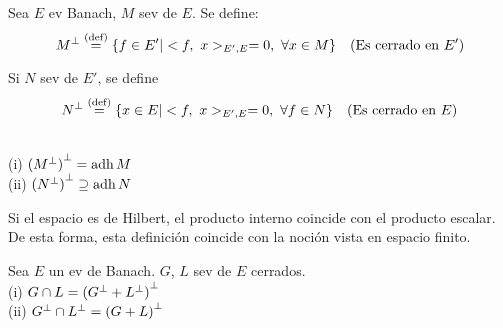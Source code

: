 
\renewcommand{\catnum}{8 (6 No Presencial)}%
\renewcommand{\fecha}{13 de abril de 2020}


\begin{defn} 
Sea $E$ ev Banach, $M$ sev de $E$. Se define:
$$M\ort \defeq \{ f \in E' | \prodint[E', E]{f}{x} = 0, \ \forall x \in M \} \quad \text{(Es cerrado en $E'$)}$$


Si $N$ sev de $E'$, se define
$$N\ort \defeq \{ x \in E | \prodint[E', E]{f}{x} = 0, \ \forall f \in N \} \quad \text{(Es cerrado en $E$)}$$
\end{defn}

\begin{prop} \\
(i) ${(M\ort)}\ort = \adh M$ \\
(ii) ${(N\ort)}\ort \supseteq \adh N$
\end{prop}

Si el espacio es de Hilbert, el producto interno coincide con el producto escalar. De esta forma, esta definición coincide con la noción vista en espacio finito.

\begin{prop}
Sea $E$ un ev de Banach. $G$, $L$ sev de $E$ cerrados.\\
(i) $G \cap L = {(G\ort + L\ort)}\ort$\\
(ii) $G\ort \cap L\ort = {(G + L)}\ort$
\end{prop}

